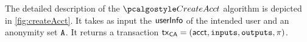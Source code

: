 



The detailed description of the $\createAcct$ algorithm is depicted in \autoref{fig:createAcct}. It takes as input the $\textup{\textsf{userInfo}}$ of the intended user and an anonymity set ${\mathtt{A}}$. It returns a transaction $\textup{\textsf{tx}}_\textsf{CA} = (\textup{\textsf{acct}}, {\textup{\texttt{inputs}}}, {\textup{\texttt{outputs}}}, \pi)$.

